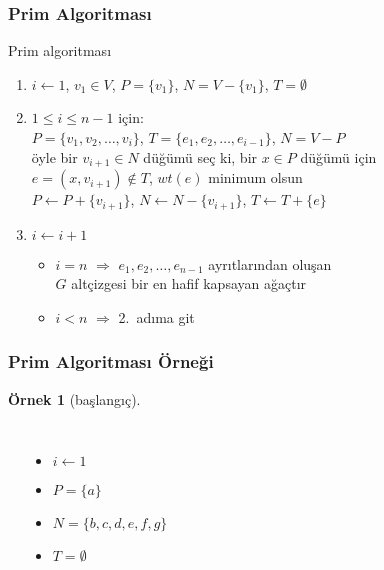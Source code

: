 \documentclass[dvipsnames]{beamer}
\theoremstyle{definition}
\theoremstyle{example}
\newtheorem{ornek}[theorem]{Örnek}
\theoremstyle{plain}
\begin{document}
\begin{frame}
  \frametitle{Prim Algoritması}

  \begin{block}{Prim algoritması}
    \begin{enumerate}
      \item $i \leftarrow 1$, $v_1 \in V$, $P=\{v_1\}$, $N=V-\{v_1\}$,
        $T=\emptyset$

      \pause
      \item $1 \leq i \leq n-1$ için:\\
        $P=\{v_1,v_2,\dots,v_i\}$, $T=\{e_1,e_2,\dots,e_{i-1}\}$, $N=V-P$\\
        öyle bir $v_{i+1} \in N$ düğümü seç ki, bir $x \in P$ düğümü için\\
        $e=(x,v_{i+1}) \notin T$, $wt(e)$ minimum olsun\\
        $P \leftarrow P+\{v_{i+1}\}$, $N \leftarrow N-\{v_{i+1}\}$,
        $T \leftarrow T+\{e\}$

      \pause
      \item $i \leftarrow i+1$
      \begin{itemize}
        \item $i=n$ $\Rightarrow$ $e_1,e_2,\dots,e_{n-1}$ ayrıtlarından oluşan\\
          $G$ altçizgesi bir en hafif kapsayan ağaçtır
        \item $i<n$ $\Rightarrow$ 2.~adıma git
      \end{itemize}
    \end{enumerate}
  \end{block}
\end{frame}

\begin{frame}
  \frametitle{Prim Algoritması Örneği}

  \begin{ornek}[başlangıç]
    \begin{columns}
      \begin{center}
      \end{center}

      \pause
      \begin{itemize}
        \item $i \leftarrow 1$
        \item $P = \{ a \}$
        \item $N = \{ b, c, d, e, f, g \}$
        \item $T = \emptyset$
      \end{itemize}
    \end{columns}
  \end{ornek}
\end{frame}
\end{document}
